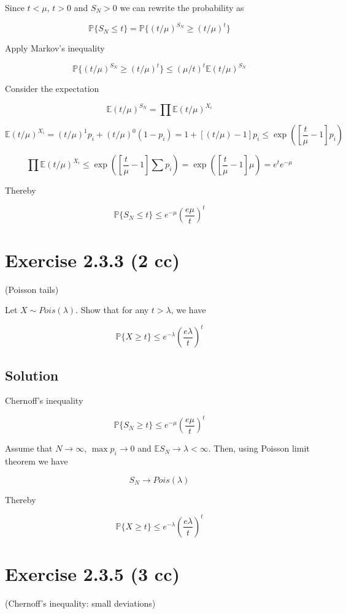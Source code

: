 \documentclass{article}
\begin{document}
Since $t<\mu$, $t>0$ and $S_N>0$ we can rewrite the probability as

$$\mathbb P\{S_N \leq t\} = \mathbb P\{(t/\mu)^{S_N} \geq (t/\mu)^t\}$$

Apply Markov's inequality

$$\mathbb P\{(t/\mu)^{S_N} \geq (t/\mu)^t\} \leq (\mu/t)^t\mathbb E (t/\mu)^{S_N}$$

Consider the expectation

$$\mathbb E (t/\mu)^{S_N} = \prod \mathbb E (t/\mu)^{X_i}$$

$$\mathbb E (t/\mu)^{X_i} = (t/\mu)^1p_i + (t/\mu)^0(1-p_i) = 1 + [(t/\mu) - 1]p_i \leq \exp \left(\left[\frac{t}{\mu}-1\right]p_i\right)$$

$$\prod \mathbb E (t/\mu)^{X_i} \leq \exp \left(\left[\frac{t}{\mu}-1\right]\sum p_i\right) = \exp \left(\left[\frac{t}{\mu}-1\right]\mu \right) = e^te^{-\mu}$$

Thereby

$$\mathbb P\{S_N \leq t\} \leq e^{-\mu}\left(\frac{e\mu}{t}\right)^t$$

\section{Exercise 2.3.3 (2 cc)}
(Poisson tails)

Let $X \sim Pois(\lambda)$. Show that for any $t > \lambda$, we have

$$\mathbb P\{X \geq t\} \leq e^{-\lambda}\left(\frac{e\lambda}{t}\right)^t$$

\subsection{Solution}

Chernoff’s inequality

$$\mathbb P\{S_N \geq t\} \leq e^{-\mu}\left(\frac{e\mu}{t}\right)^t$$

Assume that $N \to \infty$, $\max p_i \to 0$ and $\mathbb E S_N \to \lambda < \infty$. Then, using Poisson limit theorem we have

$$S_N \to Pois(\lambda)$$

Thereby

$$\mathbb P\{X \geq t\} \leq e^{-\lambda}\left(\frac{e\lambda}{t}\right)^t$$

\section{Exercise 2.3.5 (3 cc)}
(Chernoff’s inequality: small deviations)
\end{document}
